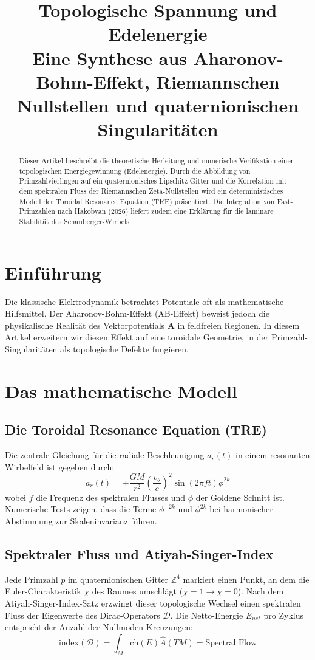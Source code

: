 \documentclass[11pt,a4paper]{article}
\title{\textbf{Topologische Spannung und Edelenergie}\\ \large Eine Synthese aus Aharonov-Bohm-Effekt, Riemannschen Nullstellen und quaternionischen Singularitäten}
\begin{document}
	
	\maketitle
	
	\begin{abstract}
		Dieser Artikel beschreibt die theoretische Herleitung und numerische Verifikation einer topologischen Energiegewinnung (Edelenergie). Durch die Abbildung von Primzahlvierlingen auf ein quaternionisches Lipschitz-Gitter und die Korrelation mit dem spektralen Fluss der Riemannschen Zeta-Nullstellen wird ein deterministisches Modell der Toroidal Resonance Equation (TRE) präsentiert. Die Integration von Fast-Primzahlen nach Hakobyan (2026) liefert zudem eine Erklärung für die laminare Stabilität des Schauberger-Wirbels.
	\end{abstract}
	
	\section{Einführung}
	Die klassische Elektrodynamik betrachtet Potentiale oft als mathematische Hilfsmittel. Der Aharonov-Bohm-Effekt (AB-Effekt) beweist jedoch die physikalische Realität des Vektorpotentials $\mathbf{A}$ in feldfreien Regionen. In diesem Artikel erweitern wir diesen Effekt auf eine toroidale Geometrie, in der Primzahl-Singularitäten als topologische Defekte fungieren.
	
	\section{Das mathematische Modell}
	
	\subsection{Die Toroidal Resonance Equation (TRE)}
	Die zentrale Gleichung für die radiale Beschleunigung $a_r(t)$ in einem resonanten Wirbelfeld ist gegeben durch:
	\begin{equation}
		a_r(t) = + \frac{GM}{r^2} \left( \frac{v_\theta}{c} \right)^2 \sin(2\pi f t) \phi^{2k}
	\end{equation}
	wobei $f$ die Frequenz des spektralen Flusses und $\phi$ der Goldene Schnitt ist. Numerische Tests zeigen, dass die Terme $\phi^{-2k}$ und $\phi^{2k}$ bei harmonischer Abstimmung zur Skaleninvarianz führen.
	
	\subsection{Spektraler Fluss und Atiyah-Singer-Index}
	Jede Primzahl $p$ im quaternionischen Gitter $\mathbb{Z}^4$ markiert einen Punkt, an dem die Euler-Charakteristik $\chi$ des Raumes umschlägt ($\chi=1 \to \chi=0$). Nach dem Atiyah-Singer-Index-Satz erzwingt dieser topologische Wechsel einen spektralen Fluss der Eigenwerte des Dirac-Operators $\mathcal{D}$. Die Netto-Energie $E_{net}$ pro Zyklus entspricht der Anzahl der Nullmoden-Kreuzungen:
	\begin{equation}
		\text{index}(\mathcal{D}) = \int_M \text{ch}(E) \hat{A}(TM) = \text{Spectral Flow}
	\end{equation}
	
\end{document}
